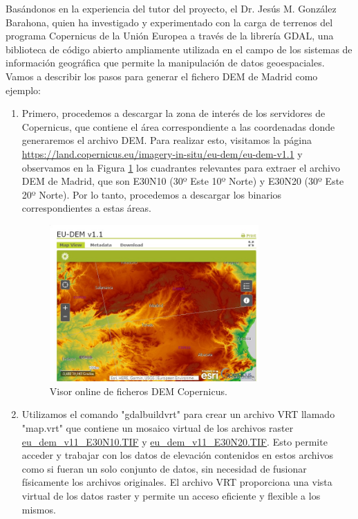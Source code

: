 \documentclass[a4paper, 11pt]{book}
\begin{document}
Basándonos en la experiencia del tutor del proyecto, el Dr. Jesús M. González Barahona, quien ha investigado y experimentado con la carga de terrenos del programa Copernicus de la Unión Europea a través de la librería GDAL, una biblioteca de código abierto ampliamente utilizada en el campo de los sistemas de información geográfica que permite la manipulación de datos geoespaciales.
Vamos a describir los pasos para generar el fichero DEM de Madrid como ejemplo:
\label{manual:generacionDem}
\begin{enumerate}
    \item Primero, procedemos a descargar la zona de interés de los servidores de Copernicus, que contiene el área correspondiente a las coordenadas donde generaremos el archivo DEM. Para realizar esto, visitamos la página \url{https://land.copernicus.eu/imagery-in-situ/eu-dem/eu-dem-v1.1} y observamos en la Figura \ref{fig:copernicus} los cuadrantes relevantes para extraer el archivo DEM de Madrid, que son E30N10 (30º Este 10º Norte) y E30N20 (30º Este 20º Norte). Por lo tanto, procedemos a descargar los binarios correspondientes a estas áreas.
\begin{figure}[h]
  \centering
  \includegraphics[width=8cm, keepaspectratio]{img/copernicus.jpg}
  \caption{Visor online de ficheros DEM Copernicus.}
  \label{fig:copernicus}
\end{figure}
    \item Utilizamos el comando "gdalbuildvrt" para crear un archivo VRT llamado "map.vrt" que contiene un mosaico virtual de los archivos raster \url{eu_dem_v11_E30N10.TIF} y \url{eu_dem_v11_E30N20.TIF}. Esto permite acceder y trabajar con los datos de elevación contenidos en estos archivos como si fueran un solo conjunto de datos, sin necesidad de fusionar físicamente los archivos originales. El archivo VRT proporciona una vista virtual de los datos raster y permite un acceso eficiente y flexible a los mismos.


\end{enumerate}
\end{document}
